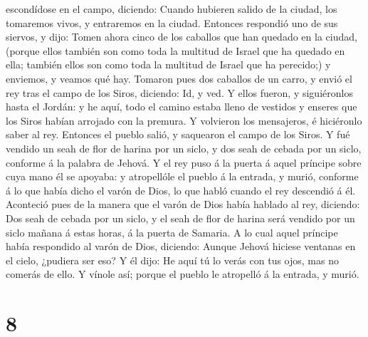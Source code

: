 escondídose en el campo, diciendo: Cuando hubieren salido de la ciudad,
los tomaremos vivos, y entraremos en la ciudad.  Entonces
respondió uno de sus siervos, y dijo: Tomen ahora cinco de los caballos
que han quedado en la ciudad, (porque ellos también son como toda la
multitud de Israel que ha quedado en ella; también ellos son como toda
la multitud de Israel que ha perecido;) y enviemos, y veamos qué hay.
 Tomaron pues dos caballos de un carro, y envió el rey
tras el campo de los Siros, diciendo: Id, y ved.  Y ellos
fueron, y siguiéronlos hasta el Jordán: y he aquí, todo el camino estaba
lleno de vestidos y enseres que los Siros habían arrojado con la
premura. Y volvieron los mensajeros, é hiciéronlo saber al rey.
 Entonces el pueblo salió, y saquearon el campo de los
Siros. Y fué vendido un seah de flor de harina por un siclo, y dos seah
de cebada por un siclo, conforme á la palabra de Jehová. 
Y el rey puso á la puerta á aquel príncipe sobre cuya mano él se
apoyaba: y atropellóle el pueblo á la entrada, y murió, conforme á lo
que había dicho el varón de Dios, lo que habló cuando el rey descendió á
él.  Aconteció pues de la manera que el varón de Dios
había hablado al rey, diciendo: Dos seah de cebada por un siclo, y el
seah de flor de harina será vendido por un siclo mañana á estas horas, á
la puerta de Samaria.  A lo cual aquel príncipe había
respondido al varón de Dios, diciendo: Aunque Jehová hiciese ventanas en
el cielo, ¿pudiera ser eso? Y él dijo: He aquí tú lo verás con tus ojos,
mas no comerás de ello.  Y vínole así; porque el pueblo
le atropelló á la entrada, y murió.

\hypertarget{section-7}{%
\section{8}\label{section-7}}

